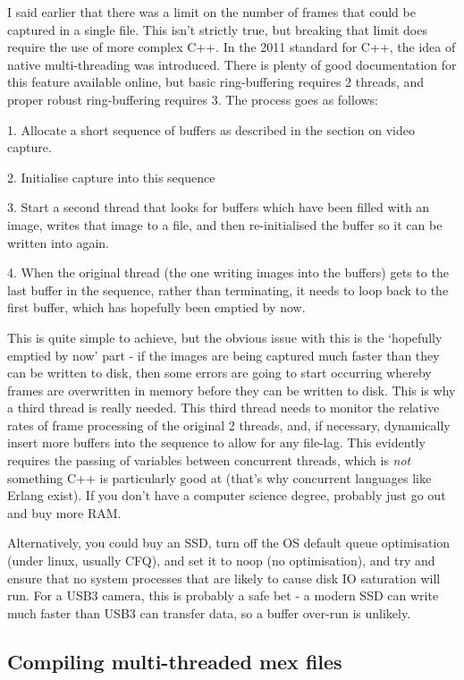 \documentclass[12pt,a4paper]{article}
\begin{document}
I said earlier that there was a limit on the number of frames that could be captured in a single file. This isn't strictly true, but breaking that limit does require the use of more complex C++. In the 2011 standard for C++, the idea of native multi-threading was introduced. There is plenty of good documentation for this feature available online, but basic ring-buffering requires 2 threads, and proper robust ring-buffering requires 3. The process goes as follows:

1. Allocate a short sequence of buffers as described in the section on video capture.

2. Initialise capture into this sequence

3. Start a second thread that looks for buffers which have been filled with an image, writes that image to a file, and then re-initialised the buffer so it can be written into again.

4. When the original thread (the one writing images into the buffers) gets to the last buffer in the sequence, rather than terminating, it needs to loop back to the first buffer, which has hopefully been emptied by now.

This is quite simple to achieve, but the obvious issue with this is the `hopefully emptied by now' part - if the images are being captured much faster than they can be written to disk, then some errors are going to start occurring whereby frames are overwritten in memory before they can be written to disk. This is why a third thread is really needed. This third thread needs to monitor the relative rates of frame processing of the original 2 threads, and, if necessary, dynamically insert more buffers into the sequence to allow for any file-lag. This evidently requires the passing of variables between concurrent threads, which is \emph{not} something C++ is particularly good at (that's why concurrent languages like Erlang exist). If you don't have a computer science degree, probably just go out and buy more RAM.

Alternatively, you could buy an SSD, turn off the OS default queue optimisation (under linux, usually CFQ), and set it to noop (no optimisation), and try and ensure that no system processes that are likely to cause disk IO saturation will run. For a USB3 camera, this is probably a safe bet - a modern SSD can write much faster than USB3 can transfer data, so a buffer over-run is unlikely.

\subsection{Compiling multi-threaded mex files}
\end{document}

